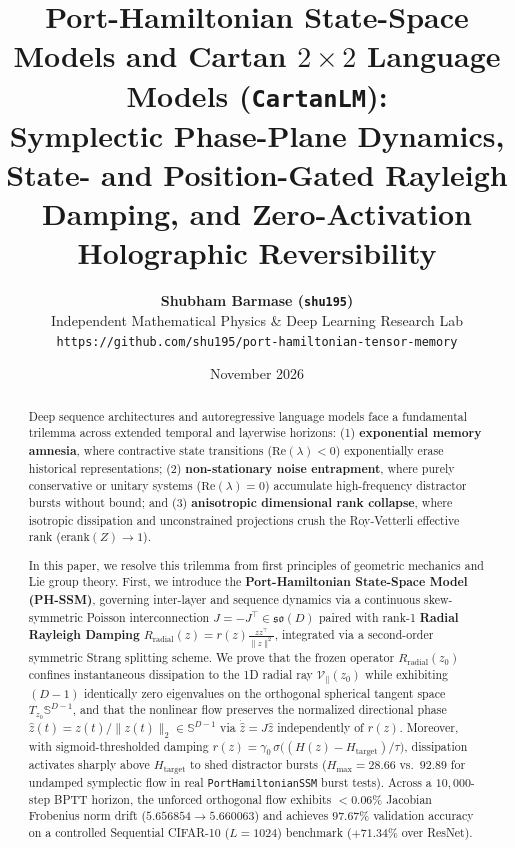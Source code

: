 \documentclass[11pt,a4paper]{article}
\title{\textbf{\Large Port-Hamiltonian State-Space Models and Cartan $2\times 2$ Language Models (\texttt{CartanLM}):}\\[0.4em]
\large Symplectic Phase-Plane Dynamics, State- and Position-Gated Rayleigh Damping, and Zero-Activation Holographic Reversibility}
\author{
  \textbf{Shubham Barmase (\texttt{shu195})}\\[0.3em]
  \small Independent Mathematical Physics \& Deep Learning Research Lab\\
  \small \texttt{https://github.com/shu195/port-hamiltonian-tensor-memory}
}
\date{November 2026}
\begin{document}
\maketitle
\vspace{-1.4em}

\begin{abstract}
\footnotesize
\setlength{\parskip}{0.35em}
Deep sequence architectures and autoregressive language models face a fundamental trilemma across extended temporal and layerwise horizons: (1) \textbf{exponential memory amnesia}, where contractive state transitions ($\mathrm{Re}(\lambda) < 0$) exponentially erase historical representations; (2) \textbf{non-stationary noise entrapment}, where purely conservative or unitary systems ($\mathrm{Re}(\lambda) = 0$) accumulate high-frequency distractor bursts without bound; and (3) \textbf{anisotropic dimensional rank collapse}, where isotropic dissipation and unconstrained projections crush the Roy-Vetterli effective rank ($\mathrm{erank}(Z) \to 1$). 

In this paper, we resolve this trilemma from first principles of geometric mechanics and Lie group theory. First, we introduce the \textbf{Port-Hamiltonian State-Space Model (PH-SSM)}, governing inter-layer and sequence dynamics via a continuous skew-symmetric Poisson interconnection $J = -J^\top \in \mathfrak{so}(D)$ paired with rank-1 \textbf{Radial Rayleigh Damping} $R_{\text{radial}}(z) = r(z)\frac{zz^\top}{\|z\|^2}$, integrated via a second-order symmetric Strang splitting scheme. We prove that the frozen operator $R_{\text{radial}}(z_0)$ confines instantaneous dissipation to the 1D radial ray $\mathcal{V}_\parallel(z_0)$ while exhibiting $(D-1)$ identically zero eigenvalues on the orthogonal spherical tangent space $T_{z_0}\mathbb{S}^{D-1}$, and that the nonlinear flow preserves the normalized directional phase $\hat{z}(t) = z(t)/\|z(t)\|_2 \in \mathbb{S}^{D-1}$ via $\dot{\hat{z}} = J\hat{z}$ independently of $r(z)$. Moreover, with sigmoid-thresholded damping $r(z) = \gamma_0\,\sigma\big((H(z) - H_{\text{target}})/\tau\big)$, dissipation activates sharply above $H_{\text{target}}$ to shed distractor bursts ($H_{\max} = 28.66$ vs.\ $92.89$ for undamped symplectic flow in real \texttt{PortHamiltonianSSM} burst tests). Across a $10,000$-step BPTT horizon, the unforced orthogonal flow exhibits $<0.06\%$ Jacobian Frobenius norm drift ($5.656854 \to 5.660063$) and achieves $97.67\%$ validation accuracy on a controlled Sequential CIFAR-10 ($L=1024$) benchmark ($+71.34\%$ over ResNet).


\end{abstract}
\end{document}
